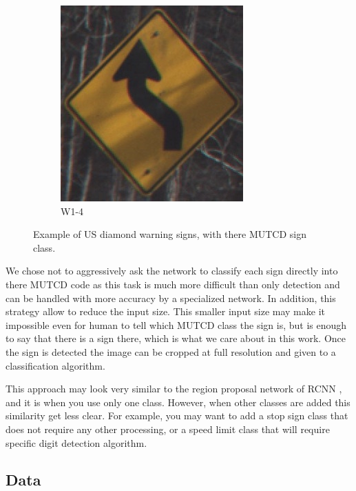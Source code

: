 \begin{figure}
\begin{center}
\begin{subfigure}[t]{.3\linewidth}
      \centering
      \includegraphics[height=0.8\linewidth]{figures/W1-4_L.jpg}
      \caption{W1-4}
    \end{subfigure}
    \caption{Example of US diamond warning signs, with there MUTCD sign class.}
    \label{signExample}
  \end{center}
\end{figure}

We chose not to aggressively ask the network to classify each sign directly into there MUTCD code as this task is much more difficult than only detection and can be handled with more accuracy by a specialized network. In addition, this strategy allow to reduce the input size. This smaller input size may make it impossible even for human to tell which MUTCD class the sign is, but is enough to say that there is a sign there, which is what we care about in this work. Once the sign is detected the image can be cropped at full resolution and given to a classification algorithm.

This approach may look very similar to the region proposal network of RCNN \cite{girshick2014rich}, and it is when you use only one class. However, when other classes are added this similarity get less clear. For example, you may want to add a stop sign class that does not require any other processing, or a speed limit class that will require specific digit detection algorithm.

\subsection{Data} \label{data_pres}
